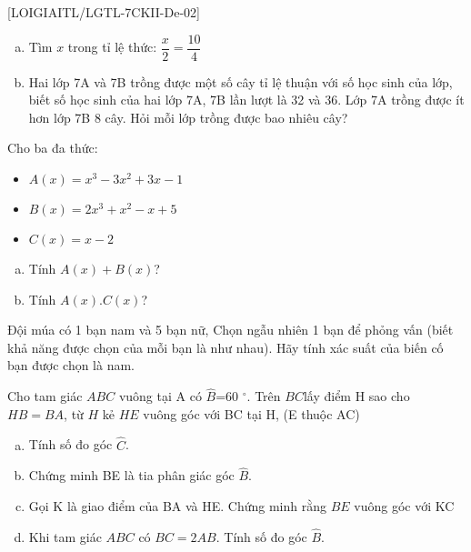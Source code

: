 

%
%

[LOIGIAITL/LGTL-7CKII-De-02]
{}
\begin{bt}[1 điểm]
	\begin{enumerate}[a)]
		\item Tìm $x$ trong tỉ lệ thức: $\dfrac{x}{2}=\dfrac{10}{4}$ 
		\item  Hai lớp 7A và 7B trồng được một số cây tỉ lệ thuận với số học sinh của lớp, biết số học sinh của hai lớp 7A, 7B lần lượt là 32 và 36. Lớp 7A trồng được ít hơn lớp 7B 8 cây. Hỏi mỗi lớp trồng được bao nhiêu cây?
	\end{enumerate}
\end{bt}

\begin{bt}[1,25 điểm]
	Cho ba đa thức:
	\begin{itemize}
		\item $A(x)=x^3-3x^2+3x-1$
		\item $B(x)=2x^3+x^2-x+5$
		\item $C(x)=x-2$
	\end{itemize}
	\begin{enumerate}[a)]
		\item  Tính $A(x)+B(x)$?
		\item  Tính $A(x).C(x)$?
	\end{enumerate}
\end{bt}
\begin{bt}[1 điểm] Đội múa có 1 bạn nam và 5 bạn nữ, Chọn ngẫu nhiên 1 bạn để phỏng vấn (biết khả năng được chọn của mỗi bạn là như nhau). Hãy tính xác suất của biến cố bạn được chọn là nam.
\end{bt}
\begin{bt}[3,75 điểm]
	Cho tam giác $ABC$ vuông tại A có $\widehat{B}$=60 $^\circ$. Trên $BC$lấy điểm H sao cho $HB=BA$, từ $H$ kẻ $HE$ vuông góc với BC tại H, (E thuộc AC)
	\begin{enumerate}[a)]
		\item Tính số đo góc $\widehat{C}$.
		\item Chứng minh BE là tia phân giác góc $\widehat{B}$.
		\item Gọi K là giao điểm của BA và HE. Chứng minh rằng $BE$ vuông góc với KC
		\item Khi tam giác $ABC$ có $BC=2AB$. Tính số đo góc $\widehat{B}$.
	\end{enumerate}
\end{bt}

